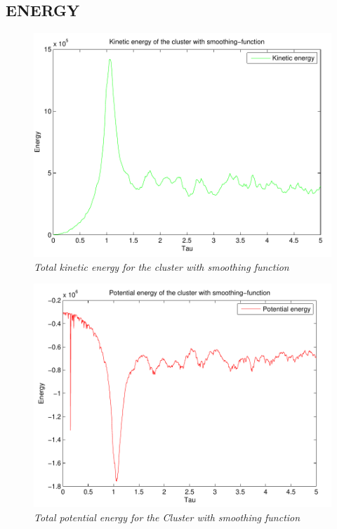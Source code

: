 \documentclass[a4paper,12pt, english]{article}
\begin{document}
\subsection*{ENERGY}



\begin{figure}
	\includegraphics[scale=0.5]{kine_n1000t5.pdf}
	\caption{\textit{Total kinetic energy for the cluster with smoothing function}}
	\label{fig:sub2}
\end{figure}
\begin{figure}
	\includegraphics[scale=0.5]{pote_n1000t5.pdf}
	\caption{\textit{Total potential energy for the Cluster with smoothing function}}
	\label{fig:pote}
\end{figure}
\end{document}
